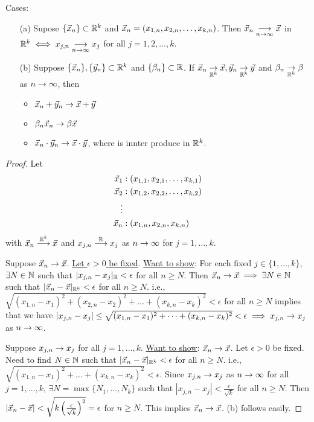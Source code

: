 \documentclass[]{article}
\begin{document}
\begin{theorem}
	Cases:
	\begin{enumerate}
		\item[(a)] Supose $\{\vec{x}_n\} \subset \mathbb{R}^k$ and $\vec{x}_n = (x_{1,n},x_{2,n},\dots, x_{k,n})$.
			Then $\vec{x}_n\underset{n\rightarrow\infty}{\longrightarrow}\vec{x}$ in $\mathbb{R}^k \iff x_{j,n} \underset{n\rightarrow\infty}{\longrightarrow} x_j$ for all $j = 1,2,\dots,k$.
		\item[(b)] Suppose $\{\vec{x}_n\},\{\vec{y}_n\} \subset \mathbb{R}^k$ and $\{\beta_n\}\subset\mathbb{R}$. 
			If $\vec{x}_n\underset{\mathbb{R}^k}{\rightarrow}\vec{x},\vec{y}_n\underset{\mathbb{R}^k}{\rightarrow}\vec{y}$ and $\beta_n\underset{\mathbb{R}^k}{\rightarrow}\beta$ as $n\rightarrow\infty$, then
			\begin{itemize}
				\item $\vec{x}_n + \vec{y}_n \rightarrow \vec{x} + \vec{y}$
				\item $\beta_n\vec{x}_n\rightarrow\beta\vec{x}$
				\item $\vec{x}_n\cdot\vec{y}_n\rightarrow\vec{x}\cdot\vec{y}$, where \say{$\cdot$} is innter produce in $\mathbb{R}^k$.
			\end{itemize}
	\end{enumerate}
\end{theorem}
\begin{proof}
	Let
	\begin{align*}
		\vec{x}_1 &: (x_{1,1},x_{2,1},\dots,x_{k,1}) \\ 
		\vec{x}_2 &: (x_{1,2},x_{2,2},\dots,x_{k,2}) \\
		\vdots \\
		\vec{x}_n &: (x_{1,n},x_{2,n},x_{k,n})
	\end{align*}
	with $\vec{x}_n \overset{\mathbb{R}^k}{\longrightarrow} \vec{x}$ and $x_{j,n}\overset{\mathbb{R}}{\longrightarrow} x_j$ as $n\rightarrow\infty$ for $j=1,\dots,k$.

	\say{$\implies$} Suppose $\vec{x}_n \rightarrow \vec{x}$. \ul{Let $\epsilon>0$ be fixed}.
	\ul{Want to show}: For each fixed $j\in\{1,\dots,k\}$, $\exists N\in\mathbb{N}$ such that $|x_{j,n}-x_j|_{\mathbb{R}} <\epsilon$ for all $n\geq N$.
	Then $\vec{x}_n\rightarrow\vec{x} \implies \exists N\in\mathbb{N}$ such that $|\vec{x}_n - \vec{x}|_{\mathbb{R}^k} < \epsilon$ for all $n\geq N$.
	i.e., $\sqrt{(x_{1,n} - x_1)^2 + (x_{2,n} - x_2)^2 + \dots + (x_{k,n}-x_k)^2} < \epsilon$ for all $n\geq N$ implies that we have $|x_{j,n}-x_j|\leq \sqrt{(x_{1,n}-x_1)^2 + \dots + (x_{k,n} - x_k)^2} < \epsilon \implies x_{j,n} \rightarrow x_j$ as $n\rightarrow\infty$.

	\say{$\Lra$} Suppose $x_{j,n}\rightarrow x_j$ for all $j = 1,\dots,k$. \ul{Want to show}: $\vec{x}_n\rightarrow\vec{x}$.
	Let $\epsilon>0$ be fixed. Need to find $N\in\mathbb{N}$ such that $|\vec{x}_n-\vec{x}|_{\mathbb{R}^k} < \epsilon$ for all $n\geq N$.
	i.e., $\sqrt{(x_{1,n} - x_1)^2 + \dots + (x_{k,n} - x_k)^2} < \epsilon$.
	Since $x_{j,n} \rightarrow x_j$ as $n\rightarrow\infty$ for all $j = 1,\dots, k$, $\exists N = \max\{ N_1,\dots, N_k\}$ such that $|x_{j,n} - x_j| < \frac{\epsilon}{\sqrt{k}}$ for all $n\geq N$.
	Then $|\vec{x}_n - \vec{x}| < \sqrt{k\left(\frac{\epsilon}{\sqrt{k}}\right)^2} = \epsilon$ for $n\geq N$. This implies $\vec{x}_n\rightarrow \vec{x}$.
	(b) follows easily.
\end{proof}
\end{document}

